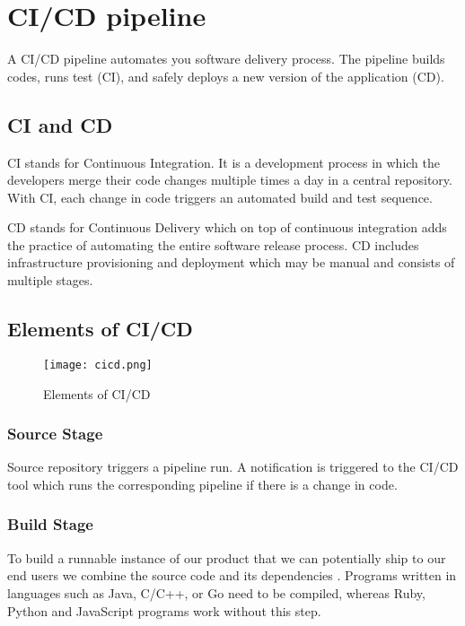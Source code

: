 \section{CI/CD pipeline}
A CI/CD pipeline automates you software delivery process. The pipeline builds codes, runs test (CI),
and safely deploys a new version of the application (CD).

\subsection{CI and CD}
CI stands for Continuous Integration. It is a development process in which the developers merge
their code changes multiple times a day in a central repository. With CI, each change in code 
triggers an automated build and test sequence.

CD stands for Continuous Delivery which on top of continuous integration adds the practice of 
automating the entire software release process. CD includes infrastructure provisioning and deployment 
which may be manual and consists of multiple stages.

\subsection{Elements of CI/CD}

\begin{figure}[h!]
    \begin{center}
        \texttt{[image: cicd.png]}
    \end{center}
    \caption{Elements of CI/CD}
    \label{fig:cicd}
\end{figure}

\subsubsection{Source Stage}
Source repository triggers a pipeline run. A notification is triggered to the CI/CD tool 
which runs the corresponding pipeline if there is a change in code. 

\subsubsection{Build Stage}
To build a runnable instance of our product that we can potentially ship to our end users we combine 
the source code and its dependencies . Programs written in languages such as Java, C/C++, or Go need 
to be compiled, whereas Ruby, Python and JavaScript programs work without this step.

